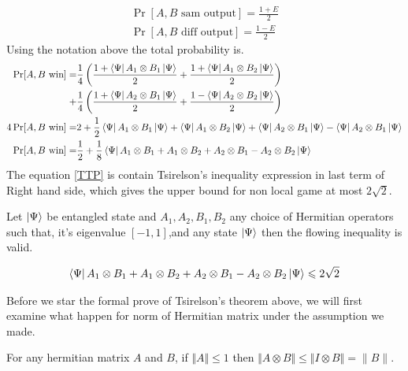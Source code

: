 \begin{align*}
\Pr[A,B \text{ sam output}]=\frac{1+E}{2}\\
\Pr[A,B \text{ diff output}]=\frac{1-E}{2}
\end{align*}
Using the notation above the total probability is.
\begin{align}\label{TTP}
\Pr[A,B \text{ win}]=&\frac{1}{4}\left(\frac{1+\bra{\Psi}A_1\otimes B_1\ket{\Psi}}{2}
+\frac{1+\bra{\Psi}A_1\otimes B_2\ket{\Psi}}{2}\right)\nonumber\\
+&\frac{1}{4}\left(\frac{1+\bra{\Psi}A_2\otimes B_1\ket{\Psi}}{2}+\frac{1-\bra{\Psi}A_2\otimes B_2\ket{\Psi}}{2}\right)\nonumber\\
4 \Pr[A,B \text{ win}]=& 2+\frac{1}{2}\bra{\Psi}A_1\otimes B_1\ket{\Psi}
+\bra{\Psi}A_1\otimes B_2\ket{\Psi}+\bra{\Psi}A_2\otimes B_1\ket{\Psi}-\bra{\Psi}A_2\otimes B_1\ket{\Psi}\nonumber\\
\Pr[A,B \text{ win}]=&\frac{1}{2}+\frac{1}{8}\bra{\Psi}A_1\otimes B_1+ A_1\otimes B_2+A_2\otimes B_1 -A_2\otimes B_2\ket{\Psi}
\end{align}
The  equation \ref{TTP} is contain  Tsirelson’s inequality expression in last term of Right hand side, which gives the upper bound for non local  game at most $2\sqrt{2}$.

\begin{theorem}


Let $\ket{\Psi}$ be entangled state and $A_1,A_2, B_1,B_2$ any choice of Hermitian operators such that, it's eigenvalue $\left[-1,1\right]$,and any state $\ket{\Psi}$ then the flowing  inequality is valid.

\begin{align}
\bra{\Psi}A_1\otimes B_1+ A_1\otimes B_2+A_2\otimes B_1 -A_2\otimes B_2\ket{\Psi}\leqslant 2\sqrt{2}\label{TE}
\end{align}

\end{theorem}


Before we star the formal prove of Tsirelson’s theorem above, we will first examine what happen for norm of Hermitian matrix under the assumption we made.

\begin{lemma}
\label{lem:tensor-norm}
For any hermitian matrix $A$ and $B$, if $\Vert A\Vert \leqslant 1$ then $\Vert A\otimes B \Vert \leqslant \Vert I\otimes B \Vert=\|B\|$.
\end{lemma}

